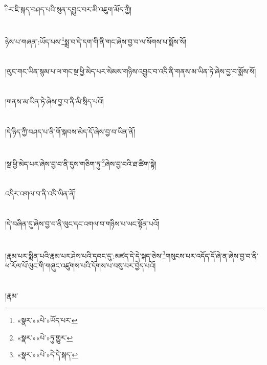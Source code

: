 ིར་ཇི་སྐད་བཤད་པའི་སུན་དབྱུང་བར་མི་འཇུག་མོད་ཀྱི།\chapter{ }ཉེས་པ་གཞན་:ཡོད་པས་\footnote{«སྣར་»«པེ་»ཡོད་པར་}སྨྲ་བ་དེ་དག་གི་ནི་གང་ཞེས་བྱ་བ་ལ་སོགས་པ་སྨོས་སོ།\chapter{ }།ལུང་གང་ཡིན་སྙམ་པ་ལ་གང་སྔ་ཕྱི་མེད་པར་སེམས་གཉིས་འབྱུང་བ་འདི་ནི་གནས་མ་ཡིན་ཏེ་ཞེས་བྱ་བ་སྨོས་སོ།\chapter{ }།གནས་མ་ཡིན་ཏེ་ཞེས་བྱ་བ་ནི་མི་སྲིད་པའོ།\chapter{ }།དེ་ཉིད་ཀྱི་བཤད་པ་ནི་གོ་སྐབས་མེད་དོ་ཞེས་བྱ་བ་ཡིན་ནོ།\chapter{ }།སྔ་ཕྱི་མེད་པར་ཞེས་བྱ་བ་ནི་དུས་གཅིག་ཏུ་\footnote{«སྣར་»«པེ་»ཏུ་གྱུར་}ཞེས་བྱ་བའི་ཐ་ཚིག་སྟེ།\chapter{ }འདིར་འགལ་བ་ནི་འདི་ཡིན་ནོ།\chapter{ }།དེ་བཞིན་དུ་ཞེས་བྱ་བ་ནི་ལུང་དང་འགལ་བ་གཉིས་པ་ཡང་སྟོན་པའོ།\chapter{ }།རྣམ་པར་སྨིན་པའི་རྣམ་པར་ཤེས་པའི་དབང་དུ་:མཛད་དེ་དེ་སྐད་ཅེས་\footnote{«སྣར་»«པེ་»དེ་དེ་སྐད་}གསུངས་པར་འདོད་དོ་ཞེ་ན་ཞེས་བྱ་བ་ནི་ཕ་རོལ་པོ་ལུང་གི་གཞུང་འཛུགས་པའི་དོགས་པ་བསུ་བར་བྱེད་པའོ།\chapter{ }།རྣམ་